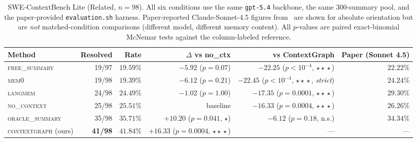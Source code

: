 \begin{table}[t]
\centering
\caption{SWE-ContextBench Lite (Related, $n{=}98$). All six conditions use the same \texttt{gpt-5.4} backbone, the same 300-summary pool, and the paper-provided \texttt{evaluation.sh} harness. Paper-reported Claude-Sonnet-4.5 figures from~\cite{swecontextbench2026} are shown for absolute orientation but are \emph{not} matched-condition comparisons (different model, different memory content). All $p$-values are paired exact-binomial McNemar tests against the column-labeled reference.}
\label{tab:swectx}
\small
\begin{tabular}{lrrrrr}
\toprule
\textbf{Method} & \textbf{Resolved} & \textbf{Rate} & \textbf{$\Delta$ vs no\_ctx} & \textbf{vs ContextGraph} & \textbf{Paper (Sonnet 4.5)} \\
\midrule
\textsc{free\_summary}   & 19/97 & $19.59\%$ & $-5.92$ ($p{=}0.07$)   & $-22.25$ ($p{<}10^{-4}$, $\star\!\star\!\star$) & $22.22\%$ \\
\textsc{mem0}            & 19/98 & $19.39\%$ & $-6.12$ ($p{=}0.21$)   & $-22.45$ ($p{<}10^{-4}$, $\star\!\star\!\star$, \emph{strict}) & $24.24\%$ \\
\textsc{langmem}         & 24/98 & $24.49\%$ & $-1.02$ ($p{=}1.00$)   & $-17.35$ ($p{=}0.0001$, $\star\!\star\!\star$) & $29.30\%$ \\
\textsc{no\_context}     & 25/98 & $25.51\%$ & baseline               & $-16.33$ ($p{=}0.0004$, $\star\!\star\!\star$) & $26.26\%$ \\
\textsc{oracle\_summary} & 35/98 & $35.71\%$ & $+10.20$ ($p{=}0.041$, $\star$) & $-6.12$ ($p{=}0.18$, n.s.) & $34.34\%$ \\
\midrule
\textsc{contextgraph} (ours) & \textbf{41/98} & $\mathbf{41.84\%}$ & \textbf{$+16.33$} ($p{=}0.0004$, $\star\!\star\!\star$) & --- & --- \\
\bottomrule
\end{tabular}
\end{table}

